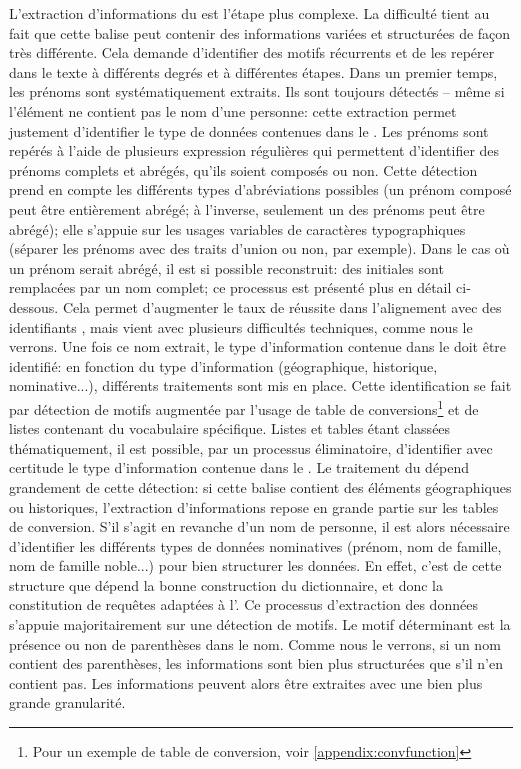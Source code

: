 L'extraction d'informations du \tname{} est l'étape plus complexe. La difficulté tient au fait que cette balise peut contenir des informations variées et structurées de façon très différente. Cela demande d'identifier des motifs récurrents et de les repérer dans le texte à différents degrés et à différentes étapes. Dans un premier temps, les prénoms sont systématiquement extraits. Ils sont toujours détectés -- même si l'élément ne contient pas le nom d'une personne: cette extraction permet justement d'identifier le type de données contenues dans le \tname{}. Les prénoms sont repérés à l'aide de plusieurs \glspl{expression régulière} qui permettent d'identifier des prénoms complets et abrégés, qu'ils soient composés ou non. Cette détection prend en compte les différents types d'abréviations possibles (un prénom composé peut être entièrement abrégé; à l'inverse, seulement un des prénoms peut être abrégé); elle s'appuie sur les usages variables de caractères typographiques (séparer les prénoms avec des traits d'union ou non, par exemple). Dans le cas où un prénom serait abrégé, il est si possible reconstruit: des initiales sont remplacées par un nom complet; ce processus est présenté plus en détail ci-dessous. Cela permet d'augmenter le taux de réussite dans l'alignement avec des identifiants \wkd{}, mais vient avec plusieurs difficultés techniques, comme nous le verrons. Une fois ce nom extrait, le type d'information contenue dans le \tname{} doit être identifié: en fonction du type d'information (géographique, historique, nominative...), différents traitements sont mis en place. Cette identification se fait par détection de motifs augmentée par l'usage de \glspl{table de conversion}\footnote{Pour un exemple de table de conversion, voir \ref{appendix:convfunction}} et de listes contenant du vocabulaire spécifique. Listes et tables étant classées thématiquement, il est possible, par un processus éliminatoire, d'identifier avec certitude le type d'information contenue dans le \tname{}. Le traitement du \tname{} dépend grandement de cette détection: si cette balise contient des éléments géographiques ou historiques, l'extraction d'informations repose en grande partie sur les tables de conversion. S'il s'agit en revanche d'un nom de personne, il est alors nécessaire d'identifier les différents types de données nominatives (prénom, nom de famille, nom de famille noble...) pour bien structurer les données. En effet, c'est de cette structure que dépend la bonne construction du \gls{dictionnaire}, et donc la constitution de requêtes adaptées à l'\api{}. Ce processus d'extraction des données s'appuie majoritairement sur une détection de motifs. Le motif déterminant est la présence ou non de parenthèses dans le nom. Comme nous le verrons, si un nom contient des parenthèses, les informations sont bien plus structurées que s'il n'en contient pas. Les informations peuvent alors être extraites avec une bien plus grande granularité.


